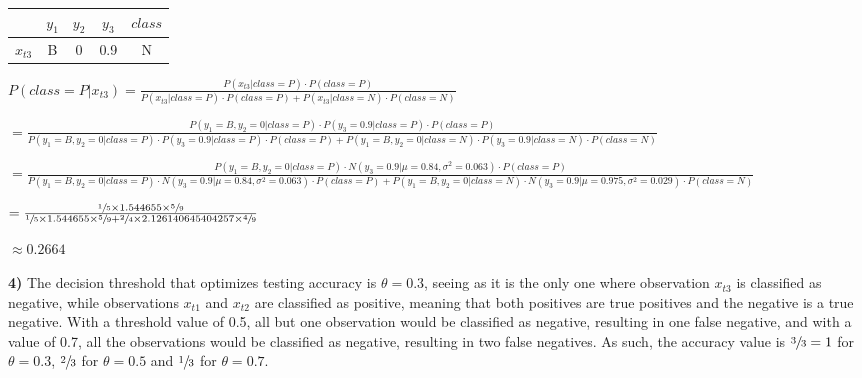 \documentclass[11pt,a4paper]{article}
\begin{document}
\begin{flushleft}
\vspace{6mm}\begin{tabular}{c|c|c|c|c|}
  \cline{2-5}
                                 & $y_1$ & $y_2$ & $y_3$ & $class$ \\ \hline
  \multicolumn{1}{|c|}{$x_{t3}$} & B     & 0     & 0.9   & N       \\ \hline
  \end{tabular} \par
  \vspace{3.5mm}\small $ P(class = P | x_{t3}) = \frac{P(x_{t3} | class = P) \cdot P(class = P)}{P(x_{t3} | class = P) \cdot P(class = P) + P(x_{t3} | class = N) \cdot P(class = N)} $ \par
  \vspace{2mm}\footnotesize $ = \frac{P(y_1 = B, y_2 = 0 | class = P) \cdot P(y_3 = 0.9 | class = P) \cdot P(class = P)}{{P(y_1 = B, y_2 = 0 | class = P) \cdot P(y_3 = 0.9 | class = P) \cdot P(class = P) + P(y_1 = B, y_2 = 0 | class = N) \cdot P(y_3 = 0.9 | class = N) \cdot P(class = N)}} $ \par
  \vspace{2mm}\footnotesize $ = \frac{P(y_1 = B, y_2 = 0 | class = P) \cdot N(y_3 = 0.9 | \mu = 0.84, \sigma^2 = 0.063) \cdot P(class = P)}{P(y_1 = B, y_2 = 0 | class = P) \cdot N(y_3 = 0.9 | \mu = 0.84, \sigma^2 = 0.063) \cdot P(class = P) + P(y_1 = B, y_2 = 0 | class = N) \cdot N(y_3 = 0.9 | \mu = 0.975, \sigma^2 = 0.029) \cdot P(class = N)} $ \par
  \vspace{2mm}\small $ = \frac{\sfrac{1}{5} \times 1.544655 \times \sfrac{5}{9}}{\sfrac{1}{5} \times 1.544655 \times \sfrac{5}{9} + \sfrac{2}{4} \times 2.126140645404257 \times \sfrac{4}{9}} $ \par
  \vspace{2.5mm}\small $ \approx 0.2664 $ \par
\end{flushleft}
\normalsize

\begin{flushleft}\vspace{2mm}
\textbf{4)}
The decision threshold that optimizes testing accuracy is $\theta = 0.3$, seeing as it is the only one where observation $x_{t3}$ is classified as negative, while observations $x_{t1}$ and $x_{t2}$ are classified as positive, meaning that both positives are true positives and the negative is a true negative. With a threshold value of 0.5, all but one observation would be classified as negative, resulting in one false negative, and with a value of 0.7, all the observations would be classified as negative, resulting in two false negatives. As such, the accuracy value is $\sfrac{3}{3} = 1$ for $\theta = 0.3$, $\sfrac{2}{3}$ for $\theta = 0.5$ and $\sfrac{1}{3}$ for $\theta = 0.7$.
\end{flushleft}
\end{document}
